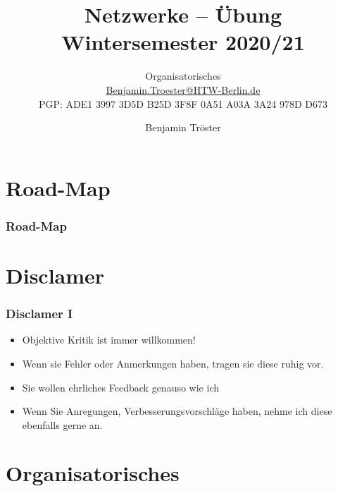 \documentclass[xcolor=dvipsnames,aspectratio=169]{beamer}
\begin{document}

\title{Netzwerke -- Übung Wintersemester 2020/21}
\subtitle{Organisatorisches\\

\href{mailto:Benjamin.Troester@HTW-Berlin.de}{Benjamin.Troester@HTW-Berlin.de}\\
		PGP: ADE1 3997 3D5D B25D 3F8F 0A51 A03A 3A24 978D D673 }

\author{Benjamin Tröster}

\date{}

\begin{frame}
\titlepage
\end{frame}

\section*{Road-Map}
\begin{frame}
\frametitle{Road-Map}
\begin{multicols}{2}
  \tableofcontents
\end{multicols}
\end{frame}

\section{Disclamer}
\begin{frame}
	\frametitle{Disclamer I}
	\begin{itemize}
		\item Objektive Kritik ist immer willkommen!
		\item Wenn sie Fehler oder Anmerkungen haben, tragen sie diese ruhig vor.
		\item Sie wollen ehrliches Feedback genauso wie ich
		\item Wenn Sie Anregungen, Verbesserungsvorschläge haben, nehme ich diese ebenfalls gerne an.
	\end{itemize}
\end{frame}

\section{Organisatorisches}
\end{document}
